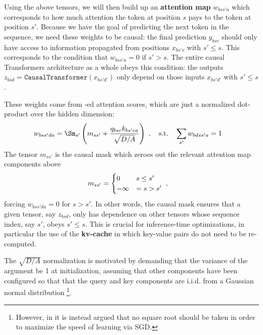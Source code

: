 \documentclass[11pt]{article}
\begin{document}
Using the above tensors, we will then build up an \textbf{attention map}  $ w _{ bss'a } $ which
corresponds to how much attention the token at position $ s $ pays to the token at position $ s' $.
Because we have the goal of predicting the next token in the sequence, we need these weights to be
causal: the final prediction $ y _{ bsv } $ should only have access to information propagated from
positions $ x _{ bs'v } $ with $ s' \le s $. This corresponds to the condition that $ w _{ bss'a} =
0  $ if  $ s' > s  $. The entire causal Transformers architecture as a whole obeys this condition:
the outputs $ z _{ bsd } = \texttt{CausalTransformer}(x _{ bs'd' }) $ only depend on those inputs $
x _{ bs'd' } $ with $ s' \le s $.

These weights come from -ed attention scores, which are just a normalized
dot-product over the hidden dimension:
\begin{align}
    w _{ bss'da } & =\Sm _{ s' } \left (m _{ s s' }+\frac{q _{ bse }k _{ bs'ea } }{ \sqrt{D/A}}  \right
	)\ ,  \quad {\rm s.t.} \quad \sum_{s'}w _{ bdss'a } =1
\end{align}
The tensor $ m _{  s s' } $ is the causal mask which zeroes out the relevant attention map
components above
\begin{align}
	m _{ s s' } & = \begin{cases}
		                0       & s \le s' \nonumber\\
		                -\infty & = s > s'
	                \end{cases}\ ,
\end{align}
forcing $ w  _{ bss'da } =0$ for $ s> s' $. In other words, the causal mask ensures that a
given tensor, say $ z _{ bsd } $, only has dependence on other tensors whose sequence index, say $
	s' $, obeys $ s' \le s $.  This is crucial for inference-time optimizations, in particular the use
of the \textbf{kv-cache} in which key-value pairs do not need to be re-computed.

The $ \sqrt{D/A} $ normalization is motivated by demanding
that the variance of the  argument be 1 at initialization, assuming that other
components have been configured so that that the query and key components are i.i.d. from a Gaussian
normal distribution \footnote{However, in \cite{yang2022tensor} it is instead argued that no square
	root should be taken in order to maximize the speed of learning via SGD.}.
\end{document}
